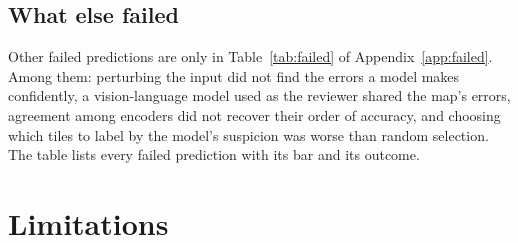 \documentclass[11pt,a4paper]{article}
\begin{document}
\subsection{What else failed}
\label{sec:res-failed}

Other failed predictions are only in Table~\ref{tab:failed} of Appendix~\ref{app:failed}. Among them: perturbing the input did not find the errors a model makes
confidently, a vision-language model used as the reviewer shared the map's errors, agreement among encoders did
not recover their order of accuracy, and choosing which tiles to label by the model's suspicion was worse than random
selection. The table lists every failed prediction with its bar and its outcome.

\section{Limitations}
\label{sec:limits}
\end{document}
